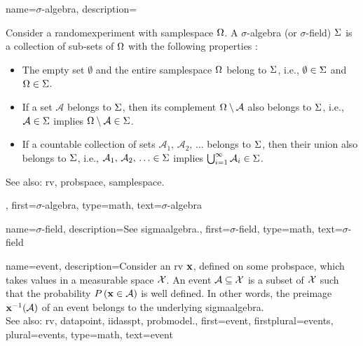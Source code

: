 {name={$\sigma$-algebra}, 
	description={Consider a \gls{randomexperiment} with \gls{samplespace} $\Omega$. 
		A $\sigma$-algebra (or $\sigma$-field) $\Sigma$ 
		is a collection of sub-sets of $\Omega$ with the following properties 
		\cite{RudinBook,BillingsleyProbMeasure,durrett2010probability}:
		 \begin{itemize}
		 	\item The empty set $\emptyset$ and the entire \gls{samplespace} 
		 	$\Omega$ belong to $\Sigma$, i.e., $\emptyset \in \Sigma$ and $\Omega \in \Sigma$.
		 	\item If a set $\mathcal{A}$ belongs to $\Sigma$, then its complement 
		 	$\Omega \setminus \mathcal{A}$ also belongs to $\Sigma$, i.e., 
		 	$\mathcal{A} \in \Sigma$ implies $\Omega \setminus \mathcal{A} \in \Sigma$.
		 	\item If a countable collection of sets $\mathcal{A}_1, \,\mathcal{A}_2, \,\ldots$ belongs 
			to $\Sigma$, 
		 	then their union also belongs to $\Sigma$, i.e.,
		 	$\mathcal{A}_1, \,\mathcal{A}_2, \,\ldots \in \Sigma$ implies 
		 	$\bigcup_{i=1}^{\infty} \mathcal{A}_i \in \Sigma$.	
		 \end{itemize}			 
		See also: \gls{rv}, \gls{probspace}, \gls{samplespace}.},
	first={$\sigma$-algebra},
	type=math, 
	text={$\sigma$-algebra} 
}

{name={$\sigma$-field}, 
	description={See \gls{sigmaalgebra}.}, 
	first={$\sigma$-field},
	type=math,
	text={$\sigma$-field} 
}



{name={event}, 
	description={Consider an \gls{rv} ${\bf x}$, defined on some \gls{probspace}, 
		which takes values in a \gls{measurable} space $\mathcal{X}$. An 
		event $\mathcal{A} \subseteq \mathcal{X}$ is a subset of $\mathcal{X}$ 
		such that the \gls{probability} $P\left({\bf x} \in \mathcal{A}\right)$ is well 
		defined. In other words, the \gls{preimage} ${\bf x}^{-1}(\mathcal{A})$ 
		of an event belongs to the underlying \gls{sigmaalgebra}. 
				\\
		See also: \gls{rv}, \gls{datapoint}, \gls{iidasspt}, \gls{probmodel}.},
	first={event},
	firstplural={events},
	plural={events},
	type=math,
	text={event} 
}


